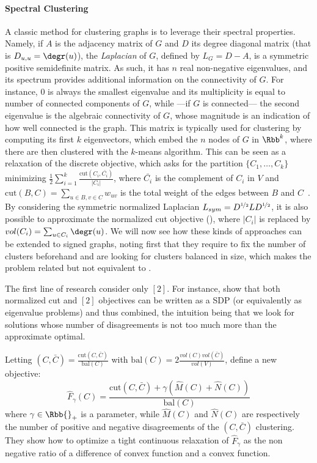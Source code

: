 \paragraph{Spectral Clustering}

A classic method for clustering graphs is to leverage their spectral properties. Namely, if $A$ is
the adjacency matrix of $G$ and $D$ its degree diagonal matrix (that is $D_{u,u} = \degr(u)$), the
\emph{Laplacian} of $G$, defined by $L_G = D - A$, is a symmetric positive semidefinite matrix. As
such, it has $n$ real non-negative eigenvalues, and its spectrum provides additional information on
the connectivity of $G$. For instance, $0$ is always the smallest eigenvalue and its multiplicity is
equal to number of connected components of $G$, while ---if $G$ is connected--- the second
eigenvalue is the algebraic connectivity of $G$, whose magnitude is an indication of how well
connected is the graph. This matrix is typically used for clustering by computing its first $k$
eigenvectors, which embed the $n$ nodes of $G$ in $\Rbb^k$, where there are then clustered with the
$k$-means algorithm. This can be seen as a relaxation of the discrete \rcut{} objective, which asks
for the partition $\{C_1, \ldots, C_k\}$ minimizing $\frac{1}{2}\sum_{i=1}^k \frac{\mathrm{cut}(C_i,
\bar{C_i})}{|C_i|}$, where $\bar{C_i}$ is the complement of $C_i$ in $V$ and $\mathrm{cut}(B, C) =
\sum_{u\in B, v\in C} w_{uv}$ is the total weight of the edges between $B$ and
$C$~\autocite{tutoSpectralClustering07}. By considering the symmetric normalized Laplacian
$L_{sym}  = D^{\nicefrac{1}{2}}LD^{\nicefrac{1}{2}}$, it is also possible to approximate the
normalized cut objective (\ncut{}), where $|C_i|$ is replaced by $vol(C_i) = \sum_{u\in C_i}
\degr(u)$. We will now see how these kinds of approaches can be extended to signed graphs, noting
first that they require to fix the number of clusters beforehand and are looking for clusters
balanced in size, which makes the problem related but not equivalent to \pcc{}.

The first line of research consider only \mind{}$[2]$. For instance, \textcite{NcutAnd2CC08} show
that both normalized cut and \mind{}$[2]$ objectives can be written as a SDP (or equivalently as
eigenvalue problems) and thus combined, the intuition being that we look for \ncut{} solutions whose
number of disagreements is not too much more than the approximate optimal.

Letting \ncut{}$(C, \bar{C}) = \frac{\mathrm{cut}(C, \bar{C})}{\mathrm{bal}(C)}$ with
$\mathrm{bal}(C) = 2\frac{vol(C)vol(\bar{C})}{vol(V)}$, \textcite{mOneCC12} define a new objective:
\begin{equation*}
  \hat{F}_\gamma(C) = \frac{\mathrm{cut}(C, \bar{C}) + \gamma\left(\hat{M}(C)+\hat{N}(C)\right)}{\mathrm{bal}(C)}
\end{equation*}
where $\gamma \in \Rbb{}_+$ is a parameter, while $\hat{M}(C)$ and $\hat{N}(C)$ are respectively the
number of positive and negative disagreements of the $(C, \bar{C})$ clustering.
They show how to optimize a tight continuous relaxation of $\hat{F}_\gamma$ as the non negative
ratio of a difference of convex function and a convex function.

